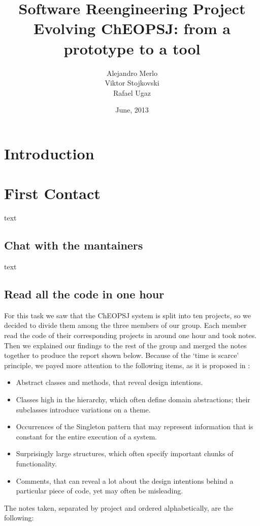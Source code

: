 \documentclass{article}
\title{Software Reengineering Project \\ Evolving ChEOPSJ: from a prototype to a tool}
\author{Alejandro Merlo\\ Viktor Stojkovski\\ Rafael Ugaz}
\date{June, 2013}
\begin{document}
\maketitle

\section{Introduction}

\section{First Contact}

text

\subsection{Chat with the mantainers}
text

\subsection{Read all the code in one hour}
For this task we saw that the ChEOPSJ system is split into ten projects, so we decided to divide them among the three members of our group. Each member read the code of their corresponding projects in around one hour and took notes. Then we explained our findings to the rest of the group and merged the notes together to produce the report shown below. Because of the `time is scarce' principle, we payed more attention to the following items, as it is proposed in \cite{demeyer02}:
\begin{itemize}
\item Abstract classes and methods, that reveal design intentions.
\item Classes high in the hierarchy, which often define domain abstractions; their subclasses introduce variations on a theme.
\item Occurrences of the Singleton pattern that may represent information that is constant for the entire execution of a system.
\item Surprisingly large structures, which often specify important chunks of functionality.
\item Comments, that can reveal a lot about the design intentions behind a particular piece of code, yet may often be misleading.
\end{itemize}

The notes taken, separated by project and ordered alphabetically, are the following:
\end{document}
